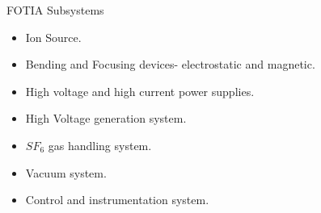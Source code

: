 \documentclass[11pt]{beamer}
\begin{document}
\begin{frame}{FOTIA Subsystems}

  \begin{itemize}
   
    \item Ion Source.
    \item Bending and Focusing devices- electrostatic and magnetic.
    \item High voltage and high current power supplies.
    \item High Voltage generation system.
    \item $SF_{6}$ gas handling system.
    \item Vacuum system.
    \item Control and instrumentation system.
   \end{itemize}

\end{frame}
\end{document}
